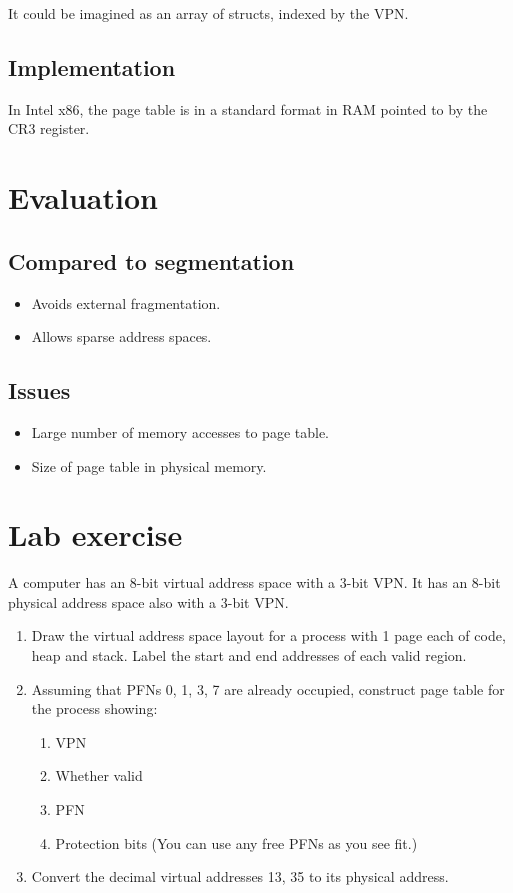 It could be imagined as an array of structs, indexed by the VPN.

\subsection{Implementation}

In Intel x86, the page table is in a standard format in RAM pointed to by the CR3 register.

\section{Evaluation}

\subsection{Compared to segmentation}

\begin{itemize}
\item Avoids external fragmentation.
\item Allows sparse address spaces.
\end{itemize}

\subsection{Issues}

\begin{itemize}
\item Large number of memory accesses to page table.
\item Size of page table in physical memory.
\end{itemize}


\section{Lab exercise}

A computer has an 8-bit virtual address space with a 3-bit VPN.
It has an 8-bit physical address space also with a 3-bit VPN. 

\begin{enumerate}
\item
	Draw the virtual address space layout for a process with 
    1 page each of code, heap and stack. 
	Label the start and end addresses of each valid region.
	
\item
	Assuming that PFNs 0, 1, 3, 7 are already occupied,
    construct page table for the process showing:
	\begin{enumerate}
	\item VPN
	\item Whether valid
	\item PFN
	\item Protection bits (You can use any free PFNs as you see fit.)
	\end{enumerate}

 	
\item
	Convert the decimal virtual addresses 13, 35 to its physical address. 
\end{enumerate}
